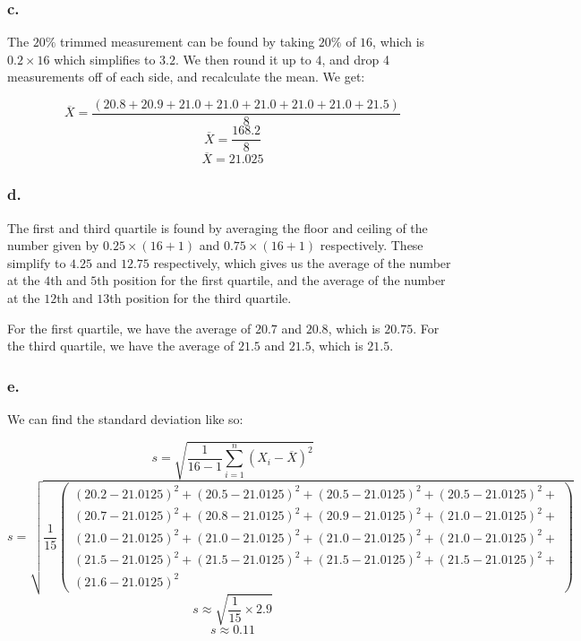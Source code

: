 \documentclass[11pt]{article}
\begin{document}
\subsubsection*{c.}
The $20\%$ trimmed measurement can be found by taking $20\%$ of $16$, which is
$0.2 \times 16$ which simplifies to $3.2$. We then round it up to $4$, and drop
4 measurements off of each side, and recalculate the mean. We get:

\[\overline{X} = \frac{\left(
        20.8+20.9+21.0+21.0+21.0+21.0+21.0+21.5
    \right)}{8}\]
\[\overline{X} = \frac{168.2}{8}\]
\[\overline{X} = 21.025\]

\subsubsection*{d.}
The first and third quartile is found by averaging the floor and ceiling of the
number given by $0.25 \times (16 + 1)$ and $0.75 \times (16 + 1)$ respectively. 
These simplify to $4.25$ and $12.75$ respectively, which gives us the average of
the number at the $4$th and $5$th position for the first quartile, and the
average of the number at the $12$th and $13$th position for the third quartile. 

For the first quartile, we have the average of $20.7$ and $20.8$, which is
$20.75$. For the third quartile, we have the average of $21.5$ and $21.5$, which
is $21.5$. 

\subsubsection*{e.}
We can find the standard deviation like so:

\[s = \sqrt{\frac{1}{16-1}\sum\limits_{i=1}^{n}{(X_i-\overline X)}^2}\]
\[s = \sqrt{
    \frac{1}{15}
    \left(\begin{array}{c} 
        {\left(20.2-21.0125\right)}^2+
        {\left(20.5-21.0125\right)}^2+
        {\left(20.5-21.0125\right)}^2+
        {\left(20.5-21.0125\right)}^2+\\
        {\left(20.7-21.0125\right)}^2+
        {\left(20.8-21.0125\right)}^2+
        {\left(20.9-21.0125\right)}^2+
        {\left(21.0-21.0125\right)}^2+\\
        {\left(21.0-21.0125\right)}^2+
        {\left(21.0-21.0125\right)}^2+
        {\left(21.0-21.0125\right)}^2+
        {\left(21.0-21.0125\right)}^2+\\
        {\left(21.5-21.0125\right)}^2+
        {\left(21.5-21.0125\right)}^2+
        {\left(21.5-21.0125\right)}^2+
        {\left(21.5-21.0125\right)}^2+\\
        {\left(21.6-21.0125\right)}^2
    \end{array}\right)
    }
\]
\[s \approx \sqrt{\frac{1}{15} \times 2.9}\]
\[s \approx 0.11 \]
\end{document}
